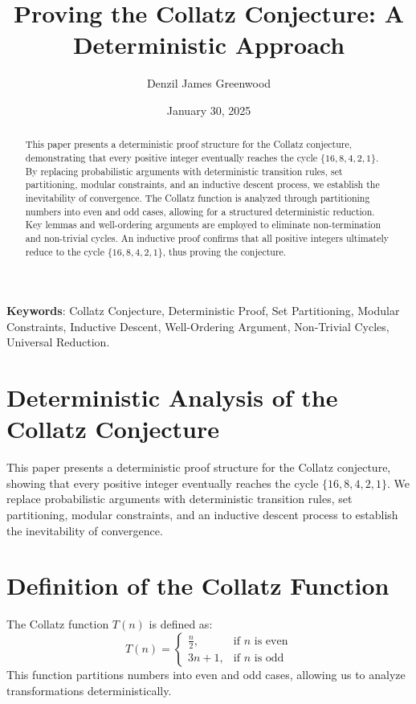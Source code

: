 \documentclass[12pt]{article}
\title{\textbf{Proving the Collatz Conjecture: A Deterministic Approach}}
\author{Denzil James Greenwood}
\date{January 30, 2025}
\begin{document}
\maketitle

\begin{abstract}
This paper presents a deterministic proof structure for the Collatz conjecture, demonstrating that every positive integer eventually reaches the cycle $\{16, 8, 4, 2, 1\}$. By replacing probabilistic arguments with deterministic transition rules, set partitioning, modular constraints, and an inductive descent process, we establish the inevitability of convergence. The Collatz function is analyzed through partitioning numbers into even and odd cases, allowing for a structured deterministic reduction. Key lemmas and well-ordering arguments are employed to eliminate non-termination and non-trivial cycles. An inductive proof confirms that all positive integers ultimately reduce to the cycle $\{16, 8, 4, 2, 1\}$, thus proving the conjecture.
\end{abstract}

\noindent \textbf{Keywords}: Collatz Conjecture, Deterministic Proof, Set Partitioning, Modular Constraints, Inductive Descent, Well-Ordering Argument, Non-Trivial Cycles, Universal Reduction.

\section{Deterministic Analysis of the Collatz Conjecture}
This paper presents a deterministic proof structure for the Collatz conjecture, showing that every positive integer eventually reaches the cycle $\{16, 8, 4, 2, 1\}$. We replace probabilistic arguments with deterministic transition rules, set partitioning, modular constraints, and an inductive descent process to establish the inevitability of convergence.

\section{Definition of the Collatz Function}
The Collatz function $T(n)$ is defined as:
\begin{equation}
    T(n) = \begin{cases} 
        \frac{n}{2}, & \text{if } n \text{ is even} \\
        3n + 1, & \text{if } n \text{ is odd}
    \end{cases}
\end{equation}
This function partitions numbers into even and odd cases, allowing us to analyze transformations deterministically.
\end{document}
